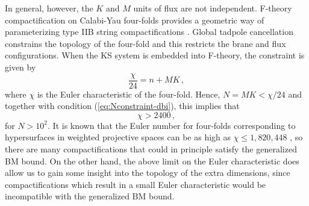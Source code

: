 In general, however, the $K$ and $M$ units of flux are not independent. 
F-theory compactification on Calabi-Yau four-folds
provides a geometric way of parameterizing  
type IIB string compactifications
\cite{witten1,witten2,witten3,sethi,gkp,klemm}. 
Global tadpole cancellation constrains the topology of the four-fold
and this restricts the brane and flux configurations.  
When the KS system is embedded into F-theory, the  
constraint is given by \cite{gkp}
% 
\begin{equation}
\label{eq:Ftheory}
\frac{\chi}{24} = n + MK \,,
\end{equation}
% 
where $\chi$ is the Euler characteristic of the four-fold.  
Hence, $N = MK < \chi /24$ and together with condition 
(\ref{eq:Nconstraint-dbi}), this implies that
% 
\begin{equation}
\label{eq:chilimit}
\chi > 2400 \,,
\end{equation}
% 
for $N > 10^2$.
It is known that the Euler number for four-folds 
corresponding to hypersurfaces in weighted projective spaces
can be as high as $\chi \le 1,820,448$ \cite{klemm},
so there are many compactifications that could 
in principle satisfy the generalized BM bound.
On the other hand, the above limit on the Euler characteristic 
does allow us to gain some insight into the 
topology of the extra dimensions, since compactifications 
which result in a small Euler characteristic would be  
incompatible with the generalized BM bound. 

% 
% 
